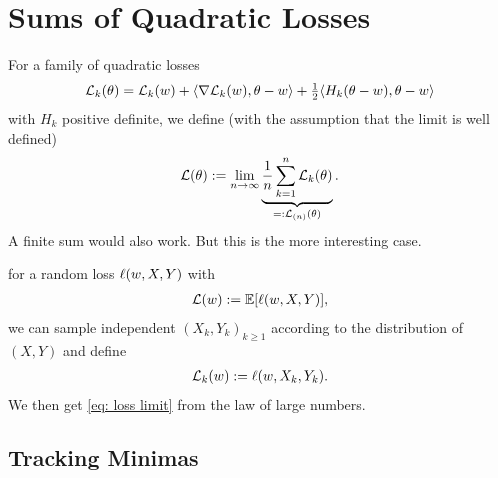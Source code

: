 \section{Sums of Quadratic Losses}

For a family of quadratic losses
\begin{align*}
	\mathcal{L}_k(\theta)
	= \mathcal{L}_k(w)
	+ \langle\nabla\mathcal{L}_k(w), \theta-w\rangle
	+ \tfrac12\langle H_k(\theta-w), \theta-w\rangle
\end{align*}
with \(H_k\) positive definite, we define (with the assumption that the
limit is well defined)
\begin{align}\label{eq: loss limit}
	\mathcal{L}(\theta) := \lim_{n\to\infty} \underbrace{\frac1n\sum_{k=1}^n \mathcal{L}_k(\theta)}_{=: \mathcal{L}_{(n)}(\theta)}.
\end{align}
A finite sum would also work. But this is the more interesting case.
\begin{example}
	for a random loss \(\ell(w, X,Y)\) with
	\begin{align*}
		\mathcal{L}(w) := \mathbb{E}[\ell(w, X,Y)],
	\end{align*}
	we can sample independent \((X_k,Y_k)_{k\ge 1}\) according to the distribution of
	\((X,Y)\) and define
	\begin{align*}
		\mathcal{L}_k(w) := \ell(w, X_k, Y_k).
	\end{align*}
	We then get \eqref{eq: loss limit} from the law of large numbers.
\end{example}

\subsection{Tracking Minimas}

